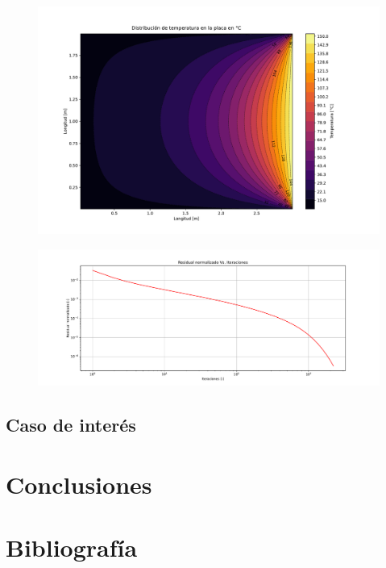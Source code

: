 \documentclass[article,latterpaper]{IEEEtran}
\begin{document}
\begin{figure}[H]
    \centering
    \includegraphics[scale=0.25]{Caso_analitico/Dist_T.pdf}
    \caption{ }
    \label{T_Sol_An_num}
\end{figure}

\begin{figure}[H]
    \centering
    \includegraphics[scale=0.2]{Caso_analitico/Residuales.pdf}
    \caption{ }
    \label{Res_An_num}
\end{figure}

\subsection{Caso de interés}

\section{Conclusiones}

\section{Bibliografía}
\end{document}
